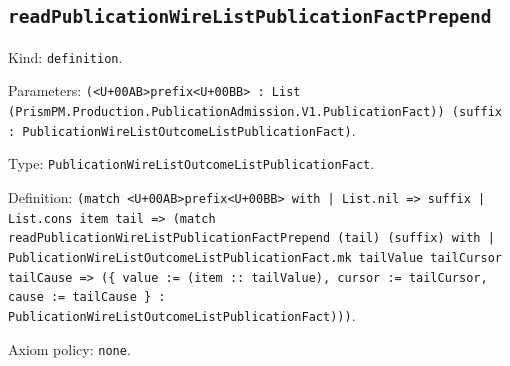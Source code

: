 \documentclass[11pt]{article}
\begin{document}
\subsection*{\texttt{readPublicationWireListPublicationFactPrepend}}
\noindent Kind: \texttt{definition}.\par
\noindent Parameters: \texttt{(<U+00AB>prefix<U+00BB> : List (PrismPM.Production.PublicationAdmission.V1.PublicationFact)) (suffix : PublicationWireListOutcomeListPublicationFact)}.\par
\noindent Type: \texttt{PublicationWireListOutcomeListPublicationFact}.\par
\noindent Definition: \texttt{(match <U+00AB>prefix<U+00BB> with | List.nil => suffix | List.cons item tail => (match readPublicationWireListPublicationFactPrepend (tail) (suffix) with | PublicationWireListOutcomeListPublicationFact.mk tailValue tailCursor tailCause => (\{ value := (item :: tailValue), cursor := tailCursor, cause := tailCause \} : PublicationWireListOutcomeListPublicationFact)))}.\par
\noindent Axiom policy: \texttt{none}.\par
\end{document}

